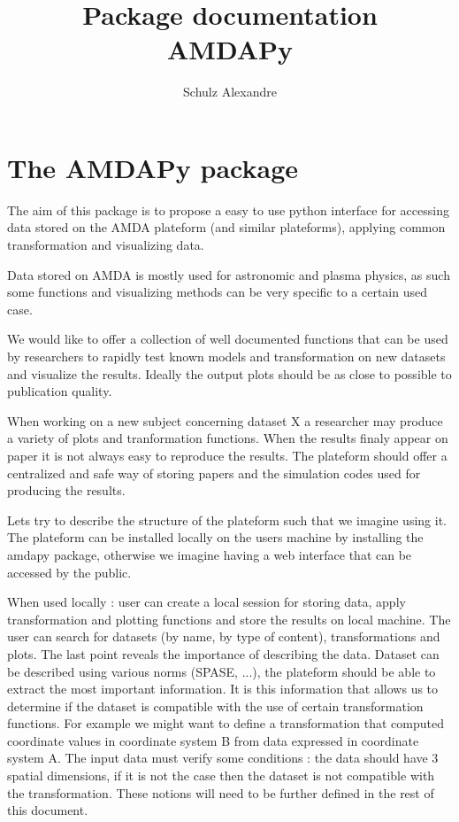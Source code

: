 \documentclass[a4paper,11pt]{report}
\author{Schulz Alexandre}
\title{Package documentation\\AMDAPy}
\begin{document}
\maketitle

\section{The AMDAPy package}
The aim of this package is to propose a easy to use python interface for accessing data stored on
the AMDA plateform (and similar plateforms), applying common transformation and visualizing data.

Data stored on AMDA is mostly used for astronomic and plasma physics, as such some functions and
visualizing methods can be very specific to a certain used case.

We would like to offer a collection of well documented functions that can be used by researchers to
rapidly test known models and transformation on new datasets and visualize the results. Ideally the 
output plots should be as close to possible to publication quality.

When working on a new subject concerning dataset X a researcher may produce a variety of plots
and tranformation functions. When the results finaly appear on paper it is not always easy to
reproduce the results. The plateform should offer a centralized and safe way of storing papers
and the simulation codes used for producing the results.

Lets try to describe the structure of the plateform such that we imagine using it. The plateform 
can be installed locally on the users machine by installing the amdapy package, otherwise we imagine 
having a web interface that can be accessed by the public.

When used locally : user can create a local session for storing data, apply transformation and plotting 
functions and store the results on local machine. The user can search for datasets (by name, by type of 
content), transformations and plots. The last point reveals the importance of describing the data. 
Dataset can be described using various norms (SPASE, ...), the plateform should be able to extract the
most important information. It is this information that allows us to determine if the dataset is
compatible with the use of certain transformation functions. For example we might want to define a 
transformation that computed coordinate values in coordinate system B from data expressed in 
coordinate system A. The input data must verify some conditions : the data should have 3 spatial 
dimensions, if it is not the case then the dataset is not compatible with the transformation. These
notions will need to be further defined in the rest of this document.
\end{document}
